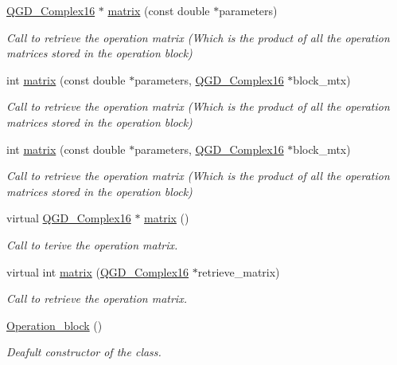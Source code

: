 \begin{DoxyCompactItemize}
\hyperlink{struct_q_g_d___complex16}{Q\+G\+D\+\_\+\+Complex16} $\ast$ \hyperlink{class_operation__block_a916db3ef5d6fcf25367843a1306cd4e0}{matrix} (const double $\ast$parameters)
\begin{DoxyCompactList}\small\item\em Call to retrieve the operation matrix (Which is the product of all the operation matrices stored in the operation block) \end{DoxyCompactList}\item 
int \hyperlink{class_operation__block_abf4287a38eeca35a81163f86a361d95c}{matrix} (const double $\ast$parameters, \hyperlink{struct_q_g_d___complex16}{Q\+G\+D\+\_\+\+Complex16} $\ast$block\+\_\+mtx)
\begin{DoxyCompactList}\small\item\em Call to retrieve the operation matrix (Which is the product of all the operation matrices stored in the operation block) \end{DoxyCompactList}\item 
int \hyperlink{class_operation__block_abf4287a38eeca35a81163f86a361d95c}{matrix} (const double $\ast$parameters, \hyperlink{struct_q_g_d___complex16}{Q\+G\+D\+\_\+\+Complex16} $\ast$block\+\_\+mtx)
\begin{DoxyCompactList}\small\item\em Call to retrieve the operation matrix (Which is the product of all the operation matrices stored in the operation block) \end{DoxyCompactList}\item 
virtual \hyperlink{struct_q_g_d___complex16}{Q\+G\+D\+\_\+\+Complex16} $\ast$ \hyperlink{class_operation_acf7d1765143285ff73772ae860109988}{matrix} ()
\begin{DoxyCompactList}\small\item\em Call to terive the operation matrix. \end{DoxyCompactList}\item 
virtual int \hyperlink{class_operation_add11c6ea2626d8dbcbd00f328a8a8279}{matrix} (\hyperlink{struct_q_g_d___complex16}{Q\+G\+D\+\_\+\+Complex16} $\ast$retrieve\+\_\+matrix)
\begin{DoxyCompactList}\small\item\em Call to retrieve the operation matrix. \end{DoxyCompactList}\item 
\hyperlink{class_operation__block_a3ee535e12ee1edb3923fc0c6340d7567}{Operation\+\_\+block} ()
\begin{DoxyCompactList}\small\item\em Deafult constructor of the class. \end{DoxyCompactList}\item 

\end{DoxyCompactItemize}
